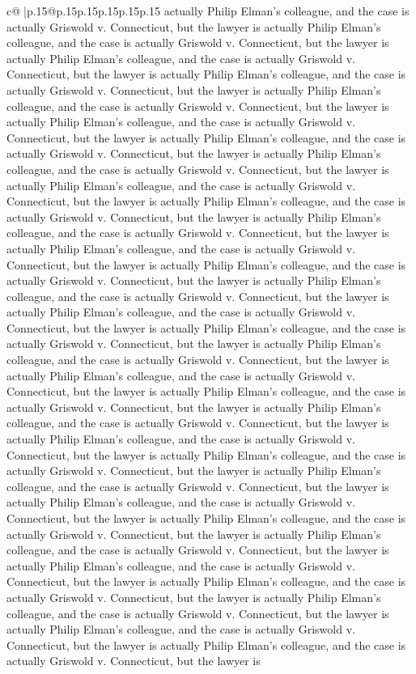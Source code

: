 \documentclass{article}
\begin{document}
{\begin{supertabular}{c@{$\;$}|p{.15\linewidth}@{}p{.15\linewidth}p{.15\linewidth}p{.15\linewidth}p{.15\linewidth}p{.15\linewidth}}
{{{actually Philip Elman's colleague, and the case is actually Griswold v. Connecticut, but the lawyer is actually Philip Elman's colleague, and the case is actually Griswold v. Connecticut, but the lawyer is actually Philip Elman's colleague, and the case is actually Griswold v. Connecticut, but the lawyer is actually Philip Elman's colleague, and the case is actually Griswold v. Connecticut, but the lawyer is actually Philip Elman's colleague, and the case is actually Griswold v. Connecticut, but the lawyer is actually Philip Elman's colleague, and the case is actually Griswold v. Connecticut, but the lawyer is actually Philip Elman's colleague, and the case is actually Griswold v. Connecticut, but the lawyer is actually Philip Elman's colleague, and the case is actually Griswold v. Connecticut, but the lawyer is actually Philip Elman's colleague, and the case is actually Griswold v. Connecticut, but the lawyer is actually Philip Elman's colleague, and the case is actually Griswold v. Connecticut, but the lawyer is actually Philip Elman's colleague, and the case is actually Griswold v. Connecticut, but the lawyer is actually Philip Elman's colleague, and the case is actually Griswold v. Connecticut, but the lawyer is actually Philip Elman's colleague, and the case is actually Griswold v. Connecticut, but the lawyer is actually Philip Elman's colleague, and the case is actually Griswold v. Connecticut, but the lawyer is actually Philip Elman's colleague, and the case is actually Griswold v. Connecticut, but the lawyer is actually Philip Elman's colleague, and the case is actually Griswold v. Connecticut, but the lawyer is actually Philip Elman's colleague, and the case is actually Griswold v. Connecticut, but the lawyer is actually Philip Elman's colleague, and the case is actually Griswold v. Connecticut, but the lawyer is actually Philip Elman's colleague, and the case is actually Griswold v. Connecticut, but the lawyer is actually Philip Elman's colleague, and the case is actually Griswold v. Connecticut, but the lawyer is actually Philip Elman's colleague, and the case is actually Griswold v. Connecticut, but the lawyer is actually Philip Elman's colleague, and the case is actually Griswold v. Connecticut, but the lawyer is actually Philip Elman's colleague, and the case is actually Griswold v. Connecticut, but the lawyer is actually Philip Elman's colleague, and the case is actually Griswold v. Connecticut, but the lawyer is actually Philip Elman's colleague, and the case is actually Griswold v. Connecticut, but the lawyer is actually Philip Elman's colleague, and the case is actually Griswold v. Connecticut, but the lawyer is actually Philip Elman's colleague, and the case is actually Griswold v. Connecticut, but the lawyer is actually Philip Elman's colleague, and the case is actually Griswold v. Connecticut, but the lawyer is actually Philip Elman's colleague, and the case is actually Griswold v. Connecticut, but the lawyer is actually Philip Elman's colleague, and the case is actually Griswold v. Connecticut, but the lawyer is actually Philip Elman's colleague, and the case is actually Griswold v. Connecticut, but the lawyer is }}}
\end{supertabular}}
\end{document}

